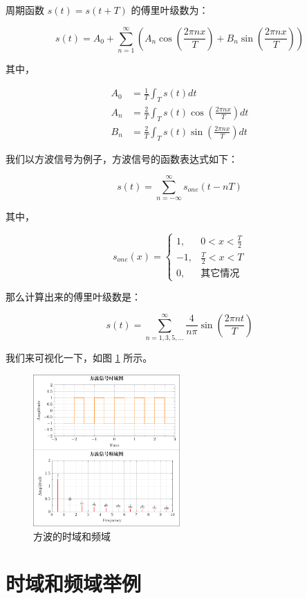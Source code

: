 \documentclass[lang=cn,newtx,10pt,scheme=chinese]{elegantbook}
\begin{document}
周期函数 $s(t) = s(t + T)$ 的傅里叶级数为：

$$
s(t) = A_0 + \sum_{n=1}^{\infty}(A_n\cos(\frac{2\pi nx}{T}) + B_n\sin(\frac{2\pi nx}{T}))
$$

其中，

\begin{align*}
A_0 &= \frac{1}{T}\int_{T}{s(t)dt} \\
A_n &= \frac{2}{T}\int_{T}{s(t)\cos(\frac{2\pi nx}{T})dt} \\
B_n &= \frac{2}{T}\int_{T}{s(t)\sin(\frac{2\pi nx}{T})dt}
\end{align*}

我们以方波信号为例子，方波信号的函数表达式如下：

$$
s(t) = \sum_{n=-\infty}^{\infty}s_{one}(t-nT)
$$

其中，

$$
s_{one}(x) = \begin{cases}
    1, & 0 < x < \frac{T}{2} \\
    -1, & \frac{T}{2} < x < T \\
    0, & \text{其它情况}
\end{cases}
$$

那么计算出来的傅里叶级数是：

$$
s(t) = \sum_{n=1,3,5,\dots}^{\infty}\frac{4}{n\pi}\sin(\frac{2\pi nt}{T})
$$

我们来可视化一下，如图 \ref{fig:square_wave_time_frequency} 所示。

\begin{figure}[!htbp]
\centering
\includegraphics[width=0.5\textwidth]{figures/square_wave_time_frequency/figure.pdf}
\caption{方波的时域和频域}
\label{fig:square_wave_time_frequency}
\end{figure}

\section{时域和频域举例}
\end{document}
